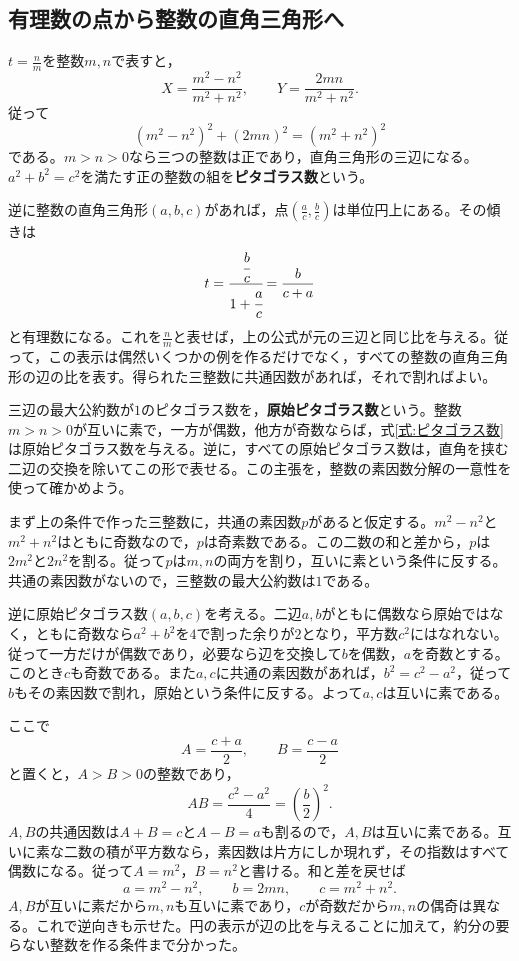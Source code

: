 \subsection{有理数の点から整数の直角三角形へ}

$t=\frac nm$を整数$m,n$で表すと，
\[
X=\frac{m^2-n^2}{m^2+n^2},\qquad
Y=\frac{2mn}{m^2+n^2}.
\]
従って
\begin{equation}\label{式:ピタゴラス数}
(m^2-n^2)^2+(2mn)^2=(m^2+n^2)^2
\end{equation}
である。$m>n>0$なら三つの整数は正であり，直角三角形の三辺になる。$a^2+b^2=c^2$を満たす正の整数の組を\textbf{ピタゴラス数}という。

逆に整数の直角三角形$(a,b,c)$があれば，点$\left(\frac ac,\frac bc\right)$は単位円上にある。その傾きは
\[
t=\cfrac{\cfrac bc}{1+\cfrac ac}=\frac{b}{c+a}
\]
と有理数になる。これを$\frac nm$と表せば，上の公式が元の三辺と同じ比を与える。従って，この表示は偶然いくつかの例を作るだけでなく，すべての整数の直角三角形の辺の比を表す。得られた三整数に共通因数があれば，それで割ればよい。

三辺の最大公約数が$1$のピタゴラス数を，\textbf{原始ピタゴラス数}という。整数$m>n>0$が互いに素で，一方が偶数，他方が奇数ならば，式\eqref{式:ピタゴラス数}は原始ピタゴラス数を与える。逆に，すべての原始ピタゴラス数は，直角を挟む二辺の交換を除いてこの形で表せる。この主張を，整数の素因数分解の一意性を使って確かめよう。

まず上の条件で作った三整数に，共通の素因数$p$があると仮定する。$m^2-n^2$と$m^2+n^2$はともに奇数なので，$p$は奇素数である。この二数の和と差から，$p$は$2m^2$と$2n^2$を割る。従って$p$は$m,n$の両方を割り，互いに素という条件に反する。共通の素因数がないので，三整数の最大公約数は$1$である。

逆に原始ピタゴラス数$(a,b,c)$を考える。二辺$a,b$がともに偶数なら原始ではなく，ともに奇数なら$a^2+b^2$を$4$で割った余りが$2$となり，平方数$c^2$にはなれない。従って一方だけが偶数であり，必要なら辺を交換して$b$を偶数，$a$を奇数とする。このとき$c$も奇数である。また$a,c$に共通の素因数があれば，$b^2=c^2-a^2$，従って$b$もその素因数で割れ，原始という条件に反する。よって$a,c$は互いに素である。

ここで
\[
A=\frac{c+a}{2},\qquad B=\frac{c-a}{2}
\]
と置くと，$A>B>0$の整数であり，
\[
AB=\frac{c^2-a^2}{4}=\left(\frac b2\right)^2.
\]
$A,B$の共通因数は$A+B=c$と$A-B=a$も割るので，$A,B$は互いに素である。互いに素な二数の積が平方数なら，素因数は片方にしか現れず，その指数はすべて偶数になる。従って$A=m^2$，$B=n^2$と書ける。和と差を戻せば
\[
a=m^2-n^2,\qquad b=2mn,\qquad c=m^2+n^2.
\]
$A,B$が互いに素だから$m,n$も互いに素であり，$c$が奇数だから$m,n$の偶奇は異なる。これで逆向きも示せた。円の表示が辺の比を与えることに加えて，約分の要らない整数を作る条件まで分かった。

